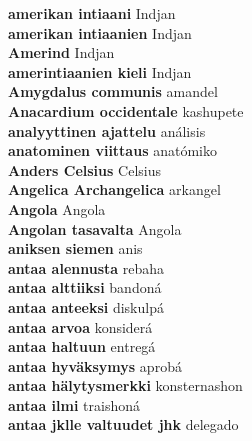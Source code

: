 \textbf{ amerikan intiaani  } Indjan \\
\textbf{ amerikan intiaanien  } Indjan \\
\textbf{ Amerind  } Indjan \\
\textbf{ amerintiaanien kieli  } Indjan \\
\textbf{ Amygdalus communis  } amandel \\
\textbf{ Anacardium occidentale  } kashupete \\
\textbf{ analyyttinen ajattelu  } análisis \\
\textbf{ anatominen viittaus  } anatómiko \\
\textbf{ Anders Celsius  } Celsius \\
\textbf{ Angelica Archangelica  } arkangel \\
\textbf{ Angola  } Angola \\
\textbf{ Angolan tasavalta  } Angola \\
\textbf{ aniksen siemen  } anis \\
\textbf{ antaa alennusta  } rebaha \\
\textbf{ antaa alttiiksi  } bandoná \\
\textbf{ antaa anteeksi  } diskulpá \\
\textbf{ antaa arvoa  } konsiderá \\
\textbf{ antaa haltuun  } entregá \\
\textbf{ antaa hyväksymys  } aprobá \\
\textbf{ antaa hälytysmerkki  } konsternashon \\
\textbf{ antaa ilmi  } traishoná \\
\textbf{ antaa jklle valtuudet jhk  } delegado \\
